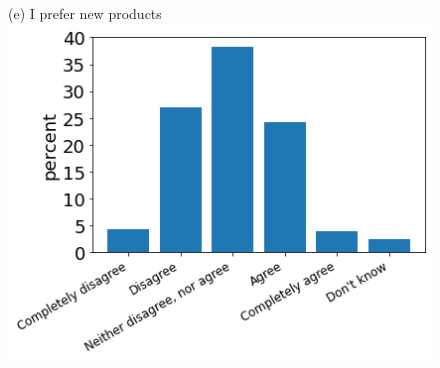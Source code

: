 \documentclass[12pt]{article}
\begin{document}
\begin{figure}[h!!]
\begin{minipage}[h!!]{0.32\textwidth}
	\end{minipage}
	\begin{minipage}[h!!]{0.32\textwidth}  
		\centering\footnotesize{(e) I prefer new products}
		\includegraphics[width=1\textwidth]{../codding_data/results/liss/qk20a148title0.png}
	\end{minipage}
\end{figure}
\end{document}
